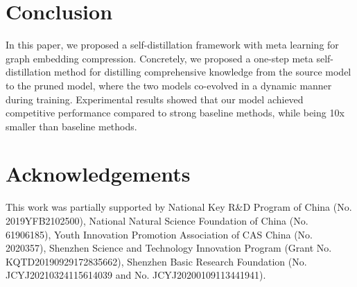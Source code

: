 \documentclass[11pt]{article}
\begin{document}
\begin{table}
\centering
{}
\caption{\label{generation}
Results of MetaSD on FB15k-237 by using different backbone models.
}
\end{table}
\section{Conclusion}
In this paper, we proposed a self-distillation framework with meta learning for graph embedding compression. Concretely, we proposed a one-step meta self-distillation method for distilling comprehensive knowledge from the source model to the pruned model, where the two models co-evolved in a dynamic manner during training. Experimental results showed that our model achieved competitive performance compared to strong baseline methods, while being 10x smaller than baseline methods. 

\section*{Acknowledgements}
This work was partially supported by National Key R\&D Program of China (No. 2019YFB2102500), National Natural Science Foundation of China (No. 61906185), Youth Innovation Promotion Association of CAS China (No. 2020357), Shenzhen Science and Technology Innovation Program (Grant No. KQTD20190929172835662), Shenzhen Basic Research Foundation (No. JCYJ20210324115614039 and No. JCYJ20200109113441941). 
\end{document}
